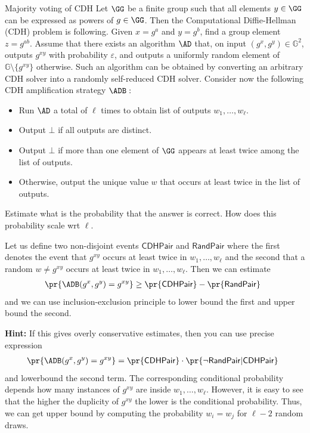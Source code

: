 \documentclass{crypto-exercise}
\author{Sven Laur}
\begin{document}
\begin{exercise}{Majority voting of CDH}
  Let $\GG$ be a finite group such that all elements $y\in\GG$ can be
  expressed as powers of $g\in\GG$. Then the Computational
  Diffie-Hellman (CDH) problem is following. Given $x=g^a$ and $y=g^b$, find a group element $z=g^{ab}$. 
  Assume that there exists an algorithm $\AD$ that, on input $(g^x, g^y)\in \mathbb{G}^2$, outputs $g^{xy}$ with probability $\varepsilon$, and outputs a uniformly random element of $\mathbb{G}\setminus\{g^{xy}\}$ otherwise. Such an algorithm can be obtained by converting an arbitrary CDH solver into a randomly self-reduced CDH solver.
Consider now the following CDH amplification strategy $\ADB:$
\begin{itemize}
  \item Run $\AD$ a total of $\ell$ times to obtain list of outputs $w_1, \ldots, w_\ell$.
  \item Output $\bot$ if all outputs are distinct.
  \item Output $\bot$ if more than one element of $\GG$ appears at least twice among the list of outputs.
  \item Otherwise, output the unique value $w$ that occurs at least twice in the list of outputs.
\end{itemize}
Estimate what is the probability that the answer is correct.   How does this probability scale wrt $\ell$.
\end{exercise}
\begin{solution}
	
Let us define two non-disjoint events $\mathsf{CDHPair}$ and $\mathsf{RandPair}$ where the first denotes the event that $g^{xy}$ occurs at least twice in $w_1, \ldots, w_\ell$ and the second that a random $w\neq g^{xy}$ occurs  at least twice in  $w_1, \ldots, w_\ell$. Then we can estimate 
\begin{align*}
\pr{\ADB(g^x,g^y)=g^{xy}}\geq \pr{\mathsf{CDHPair}}-\pr{\mathsf{RandPair}}\enspace
\end{align*}
and we can use inclusion-exclusion principle to lower bound the first and upper bound the second.
	
\noindent\textbf{Hint:} If this gives overly conservative estimates, then you can use precise expression 
\begin{align*}
\pr{\ADB(g^x,g^y)=g^{xy}}= \pr{\mathsf{CDHPair}}\cdot\pr{\neg\mathsf{RandPair}|\mathsf{CDHPair}}\enspace
\end{align*}
and lowerbound the second term. The corresponding conditional probability depends how many instances of $g^{xy}$ are inside $w_1, \ldots, w_\ell$. However, it is easy to see that the higher the duplicity of $g^{xy}$ the lower is the conditional probability. Thus, we can get upper bound by computing the probability $w_i=w_j$ for $\ell-2$ random draws.

\end{solution}
\end{document}
